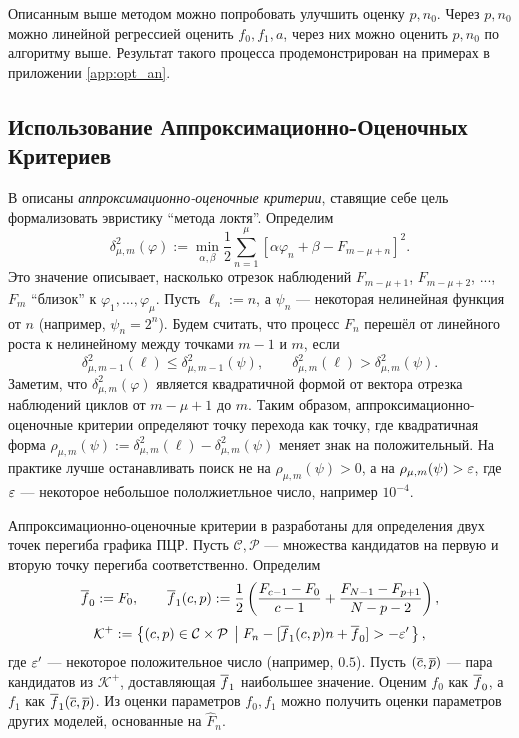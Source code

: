 Описанным выше методом можно попробовать улучшить оценку $p,n_0$. Через $p,n_0$
можно линейной регрессией оценить $f_0,f_1,a$, через них можно оценить $p,n_0$
по алгоритму выше. Результат такого процесса продемонстрирован на примерах в
приложении \ref{app:opt_an}.

\subsection{Использование Аппроксимационно-Оценочных Критериев}\label{ssec:app-est}

В
\cite{orekhovQuasiDeterministicProcessesMonotonic2021,orekhovUnsupervisedMachineLearning2023}
описаны {\it аппроксимационно-оценочные критерии}, ставящие себе цель
формализовать эвристику ``метода локтя''. Определим
\[
  \delta_{\mu,m}^{2}(\varphi) := \min_{\alpha,\beta}\frac{1}{2}
  \sum_{n=1}^{\mu}[\alpha\varphi_{n}+\beta - F_{m-\mu+n}]^{2}.
\]
Это значение описывает, насколько отрезок наблюдений $F_{m-\mu+1}$,
$F_{m-\mu+2}$, ..., $F_{m}$ ``близок'' к $\varphi_1,...,\varphi_{\mu}$. Пусть
$\ell_{n}:=n$, а $\psi_{n}$ --- некоторая нелинейная функция от $n$ (например,
$\psi_{n}=2^{n}$). Будем считать, что процесс $F_{n}$ перешёл от линейного
роста к нелинейному между точками $m-1$ и $m$, если
\[
  \delta^{2}_{\mu,m-1}(\ell)\leq\delta^{2}_{\mu,m-1}(\psi),\qquad
  \delta^{2}_{\mu,m}(\ell)>\delta^{2}_{\mu,m}(\psi).
\]
Заметим, что $\delta^{2}_{\mu,m}(\varphi)$ является квадратичной формой от
вектора отрезка наблюдений циклов от $m-\mu+1$ до $m$. Таким образом,
аппроксимационно\hyp{}оценочные критерии определяют точку перехода как точку,
где квадратичная форма
$\rho_{\mu,m}(\psi):=\delta^{2}_{\mu,m}(\ell)-\delta^{2}_{\mu,m}(\psi)$
меняет знак на положительный. На практике лучше останавливать поиск не на
$\rho_{\mu,m}(\psi)>0$, а на $\rho_{\mu,m}(\psi)>\varepsilon$, где $\varepsilon$ ---
некоторое небольшое пололжиетльное число, например $10^{-4}$.

Аппроксимационно\hyp{}оценочные критерии в
\cite{orekhovUnsupervisedMachineLearning2023} разработаны для определения двух
точек перегиба графика ПЦР. Пусть $\mathcal C,\mathcal P$ --- множества
кандидатов на первую и вторую точку перегиба соответственно. Определим
\[
  \overline{f}_0:= F_0,\qquad
  \overline{f}_1(c,p):=\frac{1}{2}\left(\frac{F_{c-1}-F_0}{c-1}
  +\frac{F_{N-1}-F_{p+1}}{N-p-2}\right),
\]
\[
  \mathcal K^{+}:=\left\{(c,p)\in\mathcal C\times\mathcal P\;\left|\;
  F_{n}- [\overline{f}_1(c,p)n+\overline{f}_0]>-\varepsilon'\right.
  \right\},
\]
где $\varepsilon'$ --- некоторое положительное число (например, $0.5$). Пусть
$(\overline{c}, \overline{p})$ --- пара кандидатов из $\mathcal K^{+}$, доставляющая
$\overline{f}_1$ наибольшее значение. Оценим $f_0$ как $\overline{f}_0$, а $f_1$ как
$\overline{f}_1(\overline{c},\overline{p})$. Из оценки параметров $f_0,f_1$ можно получить
оценки параметров других моделей, основанные на $\hat F_{n}$.

